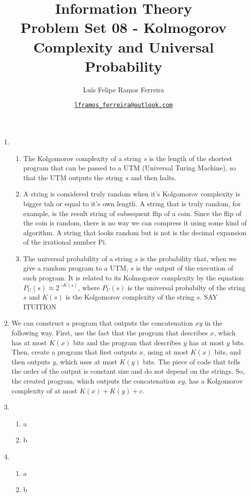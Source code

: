 \documentclass{article}
\title{Information Theory \\ \large Problem Set 08 - Kolmogorov Complexity and Universal Probability}
\author{Luís Felipe Ramos Ferreira}
\date{\href{mailto:lframos\_ferreira@outlook.com}{\texttt{lframos\_ferreira@outlook.com}}
}
\begin{document}
\maketitle

\begin{enumerate}
	\item \begin{enumerate}
		      \item The Kolgomorov complexity of a string  \(s\) is the length of the shortest program that can be passed to a UTM (Universal Turing Machine),
		            so that the UTM outputs the string \(s\) and then halts.
		      \item A string is considered truly random when it's Kolgomorov complexity is bigger tah or equal to it's own length.
		            A string that is truly random, for example, is the result string of subsequent flip of a coin. Since the flip of the coin is random, there is no way we can compress it using some kind of algorithm. A string that looks random but is not is the decimal expansion of the irrational number
		            Pi.
		      \item The universal probability of a string \(s\) is the probability that, when we give a random program to a UTM, \(s\) is the output of the execution of such program.
		            It is related to its Kolmogorov complexity by the equation \(P_U(s) \approx 2^{-K(s)}\), where \(P_U(s)\) is the universal probabilty
		            of the string \(s\) and \(K(s)\) is the Kolgomorov complexity of the string \(s\).
		            SAY ITUITION
	      \end{enumerate}

	\item We can construct a program that outputs the concatenation \(xy\) in the following way. First, use the fact that the program that describes \(x\),
	      which has at most \(K(x)\) bits and the program that describes \(y\) has at most \(y\) bits. Then, create a program that first outputs \(x\), using at most \(K(x)\) bits, and then outputs \(y\), which uses at most \(K(y)\) bits.
	      The piece of code that tells the order of the output is constant size and do not depend on the strings. So, the created program, which outputs the concatenation \(xy\), has a Kolgomorov complexity of at most \(K(x) + K(y) + c\).
	\item \begin{enumerate}
		      \item a
		      \item b
	      \end{enumerate}
	\item \begin{enumerate}
		      \item a
		      \item b
	      \end{enumerate}
\end{enumerate}


\nocite{*}
\end{document}
